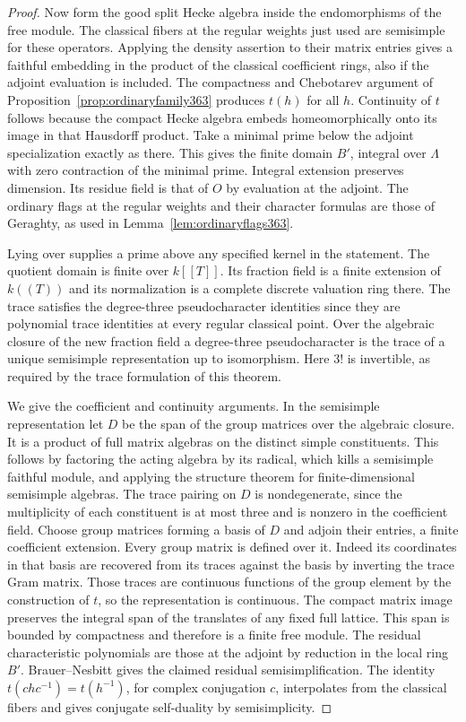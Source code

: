 \documentclass[a4paper,11pt]{article}
\theoremstyle{definition}
\theoremstyle{remark}
\numberwithin{equation}{section}
\begin{document}
\begin{proof}
Now form the good split Hecke algebra inside the endomorphisms
of the free module. The classical fibers at the regular
weights just used are semisimple for these operators. Applying
the density assertion to their matrix entries gives a faithful
embedding in the product of the classical coefficient rings,
also if the adjoint evaluation is included. The compactness
and Chebotarev argument of Proposition~\ref{prop:ordinaryfamily363}
produces \(t(h)\) for all \(h\). Continuity of \(t\) follows
because the compact Hecke algebra embeds homeomorphically onto its
image in that Hausdorff product. Take a minimal prime below
the adjoint specialization exactly as there. This gives the
finite domain \(B'\), integral over \(\Lambda\) with zero
contraction of the minimal prime. Integral extension preserves
dimension. Its residue field is that of \(O\) by evaluation
at the adjoint. The ordinary flags at the regular weights and
their character formulas are those of Geraghty, as used
in Lemma~\ref{lem:ordinaryflags363}.~\cite{VII-V-geraghty363}

Lying over supplies a prime above any specified kernel in the
statement. The quotient domain is finite over \(k[[T]]\).
Its fraction field is a finite extension of \(k((T))\) and
its normalization is a complete discrete valuation ring there.
The trace satisfies the degree-three pseudocharacter identities
since they are polynomial trace identities at every regular
classical point. Over the algebraic closure of the new fraction
field a degree-three pseudocharacter is the trace of a unique
semisimple representation up to isomorphism. Here \(3!\) is
invertible, as required by the trace formulation of this
theorem.~\cite{VII-V-chenevier364}

We give the coefficient and continuity arguments. In the
semisimple representation let \(D\) be the span of the group
matrices over the algebraic closure. It is a product of full
matrix algebras on the distinct simple constituents. This
follows by factoring the acting algebra by its radical, which
kills a semisimple faithful module, and applying the structure
theorem for finite-dimensional semisimple algebras.
The trace pairing on \(D\) is nondegenerate, since the
multiplicity of each constituent is at most three and is
nonzero in the coefficient field. Choose group matrices
forming a basis of \(D\) and adjoin their entries, a finite
coefficient extension. Every group matrix is defined over it.
Indeed its coordinates in that basis are recovered from
its traces against the basis by inverting the trace Gram
matrix. Those traces are continuous functions of the group
element by the construction of \(t\), so the representation
is continuous. The compact matrix image preserves the integral
span of the translates of any fixed full lattice.
This span is bounded by compactness and therefore is a
finite free module. The residual characteristic polynomials
are those at the adjoint by reduction in the local ring \(B'\).
Brauer--Nesbitt gives the claimed residual semisimplification.
The identity \(t(chc^{-1})=t(h^{-1})\), for complex
conjugation \(c\), interpolates from the classical fibers and
gives conjugate self-duality by semisimplicity.


\end{proof}
\end{document}
